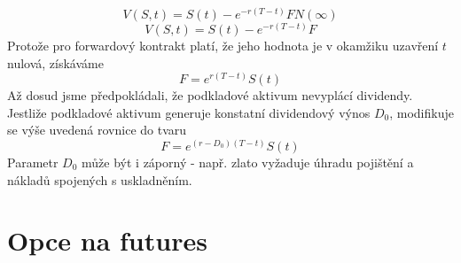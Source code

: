 \documentclass[a4paper]{book}
\begin{document}
\begin{equation*}
V(S,t) = S(t) - e^{-r(T - t)} F N(\infty)
\end{equation*}
\begin{equation*}
V(S,t) = S(t) - e^{-r(T - t)} F
\end{equation*}
Protože pro forwardový kontrakt platí, že jeho hodnota je v okamžiku uzavření $t$ nulová, získáváme
\begin{equation*}
F = e^{r(T - t)} S(t)
\end{equation*}
Až dosud jsme předpokládali, že podkladové aktivum nevyplácí dividendy. Jestliže podkladové aktivum generuje konstatní dividendový výnos $D_0$, modifikuje se výše uvedená rovnice do tvaru
\begin{equation*}
F = e^{(r - D_0)(T - t)} S(t)
\end{equation*}
Parametr $D_0$ může být i záporný - např. zlato vyžaduje úhradu pojištění a nákladů spojených s uskladněním.

\section{Opce na futures}
\end{document}
